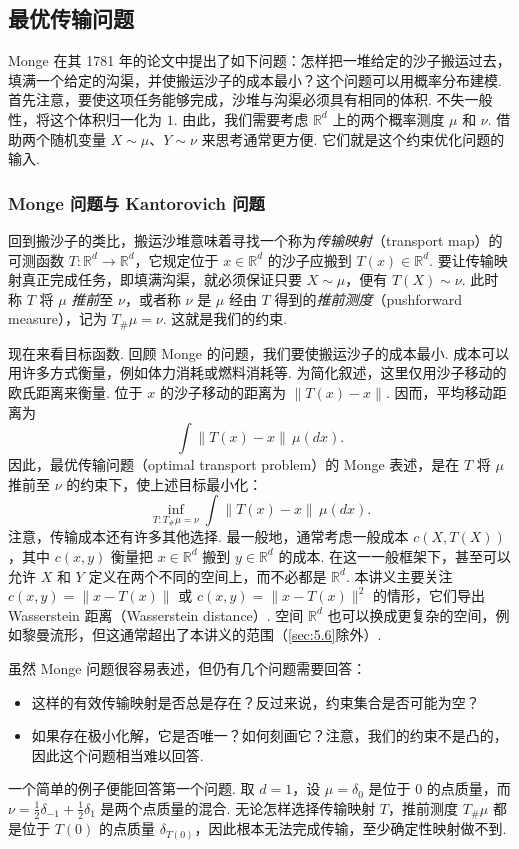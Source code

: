 \subsection{最优传输问题}\label{sec:1.1}

Monge 在其 1781 年的论文\cite{ref231}中提出了如下问题：怎样把一堆给定的沙子搬运过去，填满一个给定的沟渠，并使搬运沙子的成本最小？这个问题可以用概率分布建模. 首先注意，要使这项任务能够完成，沙堆与沟渠必须具有相同的体积. 不失一般性，将这个体积归一化为 $1$. 由此，我们需要考虑 $\mathbb R^d$ 上的两个概率测度 $\mu$ 和 $\nu$. 借助两个随机变量 $X\sim\mu$、$Y\sim\nu$ 来思考通常更方便. 它们就是这个约束优化问题的输入.

\subsubsection{Monge 问题与 Kantorovich 问题}\label{sec:1.1.1}

回到搬沙子的类比，搬运沙堆意味着寻找一个称为\emph{传输映射}（transport map）的可测函数 $T:\mathbb R^d\to\mathbb R^d$，它规定位于 $x\in\mathbb R^d$ 的沙子应搬到 $T(x)\in\mathbb R^d$. 要让传输映射真正完成任务，即填满沟渠，就必须保证只要 $X\sim\mu$，便有 $T(X)\sim\nu$. 此时称 $T$ 将 $\mu$ \emph{推前}至 $\nu$，或者称 $\nu$ 是 $\mu$ 经由 $T$ 得到的\emph{推前测度}（pushforward measure），记为 $T_\#\mu=\nu$. 这就是我们的约束.

现在来看目标函数. 回顾 Monge 的问题，我们要使搬运沙子的成本最小. 成本可以用许多方式衡量，例如体力消耗或燃料消耗等. 为简化叙述，这里仅用沙子移动的欧氏距离来衡量. 位于 $x$ 的沙子移动的距离为 $\lVert T(x)-x\rVert$. 因而，平均移动距离为
$$
\int\lVert T(x)-x\rVert\,\mu(dx).
$$
因此，最优传输问题（optimal transport problem）的 Monge 表述，是在 $T$ 将 $\mu$ 推前至 $\nu$ 的约束下，使上述目标最小化：
$$
\inf_{T:T_\#\mu=\nu}\int\lVert T(x)-x\rVert\,\mu(dx).
$$
注意，传输成本还有许多其他选择. 最一般地，通常考虑一般成本 $c(X,T(X))$，其中 $c(x,y)$ 衡量把 $x\in\mathbb R^d$ 搬到 $y\in\mathbb R^d$ 的成本. 在这一一般框架下，甚至可以允许 $X$ 和 $Y$ 定义在两个不同的空间上，而不必都是 $\mathbb R^d$. 本讲义主要关注 $c(x,y)=\lVert x-T(x)\rVert$ 或 $c(x,y)=\lVert x-T(x)\rVert^2$ 的情形，它们导出 Wasserstein 距离（Wasserstein distance）. 空间 $\mathbb R^d$ 也可以换成更复杂的空间，例如黎曼流形，但这通常超出了本讲义的范围（\autoref{sec:5.6}除外）.

虽然 Monge 问题很容易表述，但仍有几个问题需要回答：
\begin{itemize}
\item 这样的有效传输映射是否总是存在？反过来说，约束集合是否可能为空？
\item 如果存在极小化解，它是否唯一？如何刻画它？注意，我们的约束不是凸的，因此这个问题相当难以回答.
\end{itemize}
一个简单的例子便能回答第一个问题. 取 $d=1$，设 $\mu=\delta_0$ 是位于 $0$ 的点质量，而 $\nu=\frac12\delta_{-1}+\frac12\delta_1$ 是两个点质量的混合. 无论怎样选择传输映射 $T$，推前测度 $T_\#\mu$ 都是位于 $T(0)$ 的点质量 $\delta_{T(0)}$，因此根本无法完成传输，至少确定性映射做不到.

